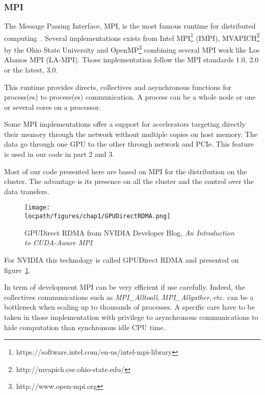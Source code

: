 \subsubsection{MPI}
The Message Passing Interface, MPI, is the most famous runtime for distributed computing~\cite{gropp2014using,gropp2015using}.
Several implementations exists from Intel MPI\footnote{https://software.intel.com/en-us/intel-mpi-library} (IMPI), MVAPICH\footnote{http://mvapich.cse.ohio-state.edu/} by the Ohio State University and OpenMP\footnote{http://www.open-mpi.org} combining several MPI work like Los Alamos MPI (LA-MPI).
Those implementation follow the MPI standards 1.0, 2.0 or the latest, 3.0. 

This runtime provides directs, collectives and asynchronous functions for process(es) to process(es) communication.
A process can be a whole node or one or several cores on a processor.  

Some MPI implementations offer a support for accelerators targeting directly their memory through the network without multiple copies on host memory. 
The data go through one GPU to the other through network and PCIe.
This feature is used in our code in part 2 and 3.

Most of our code presented here are based on MPI for the distribution on the cluster. 
The advantage is its presence on all the cluster and the control over the data transfers. 

\begin{figure}
\begin{center}
\texttt{[image: \\locpath/figures/chap1/GPUDirectRDMA.png]}
\caption{GPUDirect RDMA from NVIDIA Developer Blog, \textit{An Introduction to CUDA-Aware MPI
}}
\label{fig:1_HPC:gpudirect_rdma}
\end{center}
\end{figure}

For NVIDIA this technology is called GPUDirect RDMA and presented on figure~\ref{fig:1_HPC:gpudirect_rdma}. 

In term of development MPI can be very efficient if use carefully. 
Indeed, the collectives communications such as \textit{MPI\_Alltoall}, \textit{MPI\_Allgather}, etc. can be a bottleneck when scaling up to thousands of processes. 
A specific care have to be taken in those implementation with privilege to asynchronous communications to hide computation than synchronous idle CPU time. 

